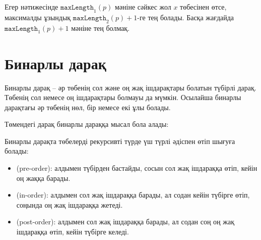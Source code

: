 Егер нәтижесінде $\texttt{maxLength}_1(p)$ мәніне 
сәйкес жол $x$ төбесінен өтсе, 
максималды ұзындық $\texttt{maxLength}_2(p)+1$-ге
тең болады. Басқа жағдайда $\texttt{maxLength}_1(p)+1$ 
мәніне тең болмақ.

\section{Бинарлы дарақ}


\begin{samepage}
Бинарлы дарақ -- әр төбенің 
сол және оң жақ ішдарақтары болатын түбірлі дарақ.
Төбенің сол немесе оң ішдарақтары болмауы да мүмкін. Осылайша
бинарлы дарақтағы әр төбенің нөл, бір немесе екі 
ұлы болады.

Төмендегі дарақ бинарлы дараққа мысал бола алады:
\begin{center}
\end{center}
\end{samepage}


Бинарлы дарақта төбелерді 
рекурсивті түрде үш түрлі әдіспен өтіп шығуға болады:

\begin{itemize}
\item {} (pre-order): алдымен түбірден бастайды, сосын сол жақ ішдараққа 
өтіп, кейін оң жаққа барады.
\item {} (in-order): алдымен сол жақ ішдараққа барады, ал
содан кейін түбірге өтіп, соңында оң жақ ішдараққа жетеді.
\item {} (post-order): алдымен сол жақ ішдараққа барады, ал содан соң
оң жақ ішдараққа өтіп, кейін түбірге келеді.
\end{itemize}

